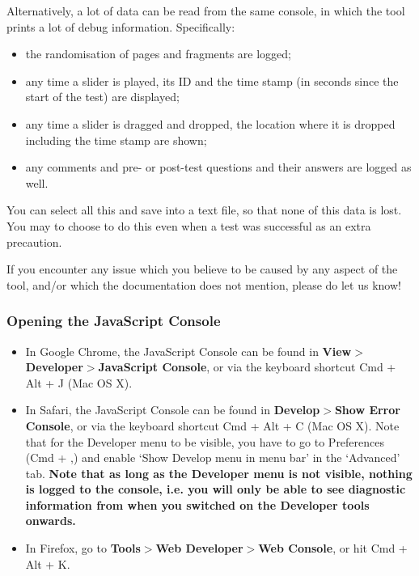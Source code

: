 \documentclass[11pt, oneside]{article}   	%
\begin{document}
		Alternatively, a lot of data can be read from the same console, in which the tool prints a lot of debug information. Specifically:
	    	\begin{itemize}
	        	\item the randomisation of pages and fragments are logged;
	        	\item any time a slider is played, its ID and the time stamp (in seconds since the start of the test) are displayed;
	        	\item any time a slider is dragged and dropped, the location where it is dropped including the time stamp are shown; 
	        	\item any comments and pre- or post-test questions and their answers are logged as well. 
	    	\end{itemize}

		You can select all this and save into a text file, so that none of this data is lost. You may to choose to do this even when a test was successful as an extra precaution. 

		If you encounter any issue which you believe to be caused by any aspect of the tool, and/or which the documentation does not mention, please do let us know! 

		\subsubsection*{Opening the JavaScript Console}
	        \begin{itemize}
	            \item In Google Chrome, the JavaScript Console can be found in \textbf{View$>$Developer$>$JavaScript Console}, or via the keyboard shortcut Cmd + Alt + J (Mac OS X). 
	            \item In Safari, the JavaScript Console can be found in \textbf{Develop$>$Show Error Console}, or via the keyboard shortcut Cmd + Alt + C (Mac OS X). Note that for the Developer menu to be visible, you have to go to Preferences (Cmd + ,) and enable `Show Develop menu in menu bar' in the `Advanced' tab. \textbf{Note that as long as the Developer menu is not visible, nothing is logged to the console, i.e. you will only be able to see diagnostic information from when you switched on the Developer tools onwards.}
	            \item In Firefox, go to \textbf{Tools$>$Web Developer$>$Web Console}, or hit Cmd + Alt + K. 
	        \end{itemize}
\end{document}
